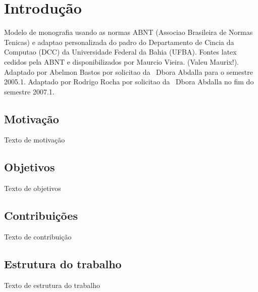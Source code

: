 \chapter{Introdução}

Modelo de monografia usando as normas ABNT (Associao Brasileira de Normas
Tenicas) 
e adaptao personalizada 
do padro do Departamento de Cincia da Computao (DCC) da Universidade
Federal da Bahia (UFBA).
Fontes latex cedidos pela ABNT e disponibilizados por 
Maurcio Vieira. (Valeu Maurix!). Adaptado por Abelmon Bastos por solicitao
da \profa\ Dbora Abdalla para o semestre 2005.1.
Adaptado por Rodrigo Rocha por solicitao da \profa\ Dbora Abdalla no fim
do semestre 2007.1.

\section{Motivação}

Texto de motivação

\section{Objetivos}

Texto de objetivos

\section{Contribuições}

Texto de contribuição

\section{Estrutura do trabalho}

Texto de estrutura do trabalho






